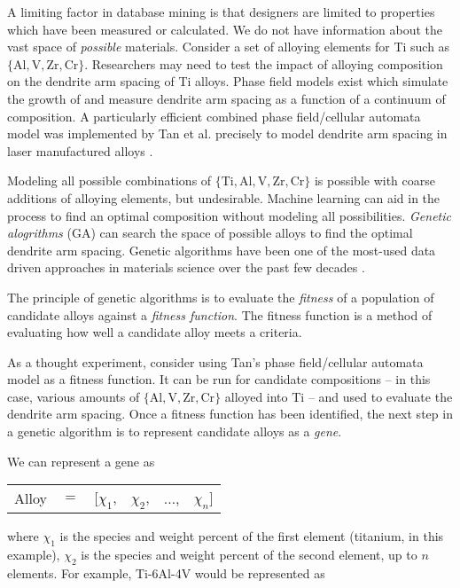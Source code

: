 A limiting factor in database mining is that designers are limited to properties which have been measured or calculated. We do not have information about the vast space of \textit{possible} materials. Consider a set of alloying elements for Ti such as $\{\text{Al}, \text{V}, \text{Zr}, \text{Cr}\}$. Researchers may need to test the impact of alloying composition on the dendrite arm spacing of Ti alloys. Phase field models exist which simulate the growth of and measure dendrite arm spacing as a function of a continuum of composition. A particularly efficient combined phase field/cellular automata model was implemented by Tan et al. precisely to model dendrite arm spacing in laser manufactured alloys \cite{Tan2011}. 

Modeling all possible combinations of $\{\text{Ti},\text{Al}, \text{V}, \text{Zr}, \text{Cr}\}$ is possible with coarse additions of alloying elements, but undesirable. Machine learning can aid in the process to find an optimal composition without modeling all possibilities. \textit{Genetic alogrithms} (GA) can search the space of possible alloys to find the optimal dendrite arm spacing. Genetic algorithms have been one of the most-used data driven approaches in materials science over the past few decades \cite{Morris1996, Ho1998, Wolf2000, Johannesson2002, Stucke2003, Hart2005, Oganov2006}.

The principle of genetic algorithms is to evaluate the \textit{fitness} of a population of candidate alloys against a \textit{fitness function}. The fitness function is a method of evaluating how well a candidate alloy meets a criteria.

As a thought experiment, consider using Tan's phase field/cellular automata model as a fitness function. It can be run for candidate compositions -- in this case, various amounts of $\{\text{Al}, \text{V}, \text{Zr}, \text{Cr}\}$ alloyed into Ti -- and used to evaluate the dendrite arm spacing. Once a fitness function has been identified, the next step in a genetic algorithm is to represent candidate alloys as a \textit{gene}. 

We can represent a gene as 

\begin{table}[h!]
\begin{tabular}{cccccc}
	Alloy & $=$ & [$\chi_1$, & $\chi_2$, & $\ldots$, & $\chi_n$] \\
\end{tabular}
\end{table}
where $\chi_1$ is the species and weight percent of the first element (titanium, in this example), $\chi_2$ is the species and weight percent of the second element, up to $n$ elements. For example, Ti-6Al-4V would be represented as

